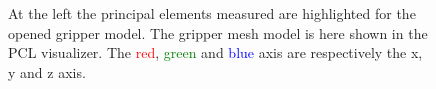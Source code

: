 \begin{figure}[htp]
\centering
\begin{subfigure}[t]{0.25\textwidth}
\centering
{}
\end{subfigure} 
\begin{subfigure}[t]{0.3\textwidth}
\centering
{}
\end{subfigure}
\hspace{1cm}
\begin{subfigure}[t]{0.3\textwidth}
\centering
{}
\end{subfigure}
\caption{At the left the principal elements measured are highlighted for the opened gripper model. The gripper mesh model is here shown in the PCL visualizer. The \textcolor{red}{red}, \textcolor{green}{green} and \textcolor{blue}{blue} axis are respectively the x, y and z axis. }\label{fig:gripper_modelling}
\end{figure}

